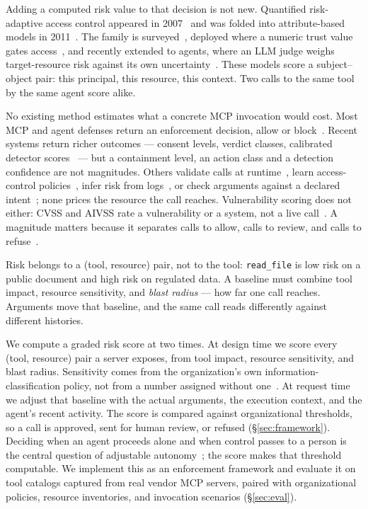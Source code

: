 Adding a computed risk value to that decision is not new. Quantified
risk-adaptive access control appeared in 2007~\cite{cheng2007fuzzymls} and was
folded into attribute-based models in 2011~\cite{kandala2011radac}. The family
is surveyed~\cite{atlam2020riskbased,cheimonidis2023dynamic}, deployed where a
numeric trust value gates access~\cite{bradatsch2024zerotrust}, and recently
extended to agents, where an {LLM} judge weighs target-resource risk against its
own uncertainty~\cite{fleming2025tbac}. These models score a subject--object
pair: this principal, this resource, this context. Two calls to the same tool by
the same agent score alike.

No existing method estimates what a concrete MCP invocation would cost. Most MCP
and agent defenses return an enforcement decision, allow or
block~\cite{xing2025mcpguard,jing2025mcip,shi2025progent,zhu2025miniscope,abaev2026agentguardian}.
Recent systems return richer outcomes --- consent levels, verdict classes,
calibrated detector
scores~\cite{li2026conleash,yang2026agenttrust,zhang2026stars,hossain2026nexus}
--- but a containment level, an action class and a detection confidence are not
magnitudes. Others validate calls at runtime~\cite{betser2026agentrim}, learn
access-control policies~\cite{abaev2026agentguardian}, infer risk from
logs~\cite{fu2025riskcue}, or check arguments against a declared
intent~\cite{zhu2026igac,rahman2026rolestratified}; none prices the resource the
call reaches. Vulnerability scoring does not either: CVSS and AIVSS rate a
vulnerability or a system, not a live
call~\cite{spring2021time,bahar2024validity,owasp2025aivss}. A magnitude matters
because it separates calls to allow, calls to review, and calls to
refuse~\cite{cao2024mad}.

Risk belongs to a (tool, resource) pair, not to the tool: \texttt{read\_file} is
low risk on a public document and high risk on regulated data. A baseline must
combine tool impact, resource sensitivity, and \emph{blast radius} --- how far
one call reaches. Arguments move that baseline, and the same call reads
differently against different histories.

We compute a graded risk score at two times. At design time we score every
(tool, resource) pair a server exposes, from tool impact, resource sensitivity,
and blast radius. Sensitivity comes from the organization's own
information-classification policy, not from a number assigned without
one~\cite{nist2004fips199,nist2008sp80060}. At request time we adjust that
baseline with the actual arguments, the execution context, and the agent's
recent activity. The score is compared against organizational thresholds, so a
call is approved, sent for human review, or refused (\S\ref{sec:framework}).
Deciding when an agent proceeds alone and when control passes to a person is the
central question of adjustable autonomy~\cite{pynadath2002adjustable}; the score
makes that threshold computable. We implement this as an enforcement framework
and evaluate it on tool catalogs captured from real vendor MCP servers, paired
with organizational policies, resource inventories, and invocation scenarios
(\S\ref{sec:eval}).

